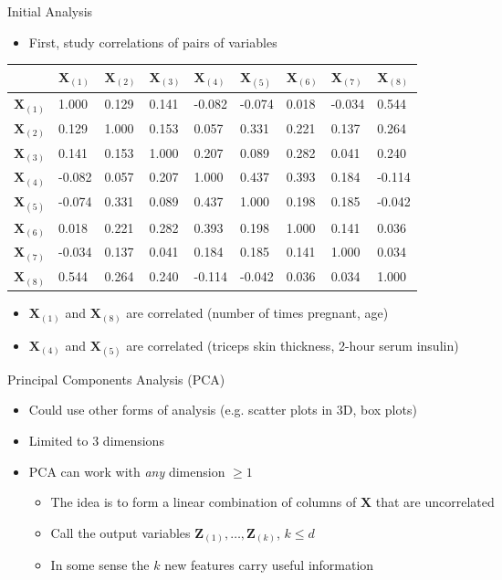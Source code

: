 \documentclass{beamer}
\begin{document}
\begin{frame}{Initial Analysis} 
\begin{itemize} 
 \item First, study correlations of pairs of variables
\end{itemize}

\begin{table}
\centering
\resizebox{\linewidth}{!} {%
\begin{tabular}{l | l l l l l l l l}
 & $\textbf{X}_{(1)}$ & $\textbf{X}_{(2)}$ & $\textbf{X}_{(3)}$ & $\textbf{X}_{(4)}$ & $\textbf{X}_{(5)}$ & $\textbf{X}_{(6)}$ & $\textbf{X}_{(7)}$ & $\textbf{X}_{(8)}$ \\ 
 \hline
$\textbf{X}_{(1)}$ & 1.000 & 0.129 & 0.141 & -0.082 & -0.074 & 0.018 & -0.034 & 0.544\\
$\textbf{X}_{(2)}$ & 0.129 & 1.000 & 0.153 & 0.057 & 0.331 & 0.221 & 0.137 & 0.264\\
$\textbf{X}_{(3)}$ & 0.141 & 0.153 & 1.000 & 0.207 & 0.089 & 0.282 & 0.041 & 0.240\\
$\textbf{X}_{(4)}$ & -0.082 & 0.057 & 0.207 & 1.000 & 0.437 & 0.393 & 0.184 & -0.114\\
$\textbf{X}_{(5)}$ & -0.074 & 0.331 & 0.089 & 0.437 & 1.000 & 0.198 & 0.185 & -0.042\\
$\textbf{X}_{(6)}$ & 0.018 & 0.221 & 0.282 & 0.393 & 0.198 & 1.000 & 0.141 & 0.036\\
$\textbf{X}_{(7)}$ & -0.034 & 0.137 & 0.041 & 0.184 & 0.185 & 0.141 & 1.000 & 0.034\\
$\textbf{X}_{(8)}$ & 0.544 & 0.264 & 0.240 & -0.114 & -0.042 & 0.036 & 0.034 & 1.000\\
\end{tabular} }
\end{table} 
\begin{itemize} 
 \item $\textbf{X}_{(1)}$ and $\textbf{X}_{(8)}$ are correlated (number of times pregnant, age)
 \item $\textbf{X}_{(4)}$ and $\textbf{X}_{(5)}$ are correlated (triceps skin thickness, 2-hour serum insulin)
\end{itemize}
\end{frame}

\begin{frame}{Principal Components Analysis (PCA)} 
\begin{itemize} 
 \item Could use other forms of analysis (e.g. scatter plots in 3D, box plots) 
 \item Limited to 3 dimensions 
 \item PCA can work with \emph{any} dimension $\geq 1$
 \begin{itemize} 
 \item The idea is to form a linear combination of columns of $\textbf{X}$ that are uncorrelated 
 \item Call the output variables $\textbf{Z}_{(1)}, \ldots, \textbf{Z}_{(k)}$, $k \leq d$
 \item In some sense the $k$ new features carry useful information 
 \end{itemize}
\end{itemize}
\end{frame}
\end{document}
